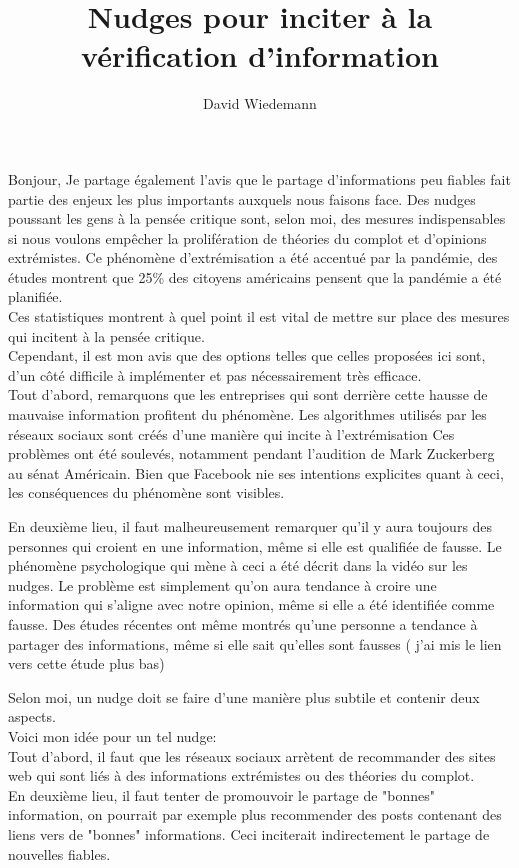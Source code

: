 \documentclass[11pt, a4paper]{article}
\begin{document}
\title{Nudges pour inciter à la vérification d'information}
\author{David Wiedemann}
\maketitle
Bonjour,
Je partage également l'avis que le partage d'informations peu fiables fait partie des enjeux les plus importants auxquels nous faisons face.
Des nudges poussant les gens à la pensée critique sont, selon moi, des mesures indispensables si nous voulons empêcher la prolifération de théories du complot et d'opinions extrémistes.
Ce phénomène d'extrémisation a été accentué par la pandémie, des études montrent   que 25\% des citoyens américains pensent que la pandémie a été planifiée.\\
Ces statistiques montrent à quel point il est vital de mettre sur place des mesures qui incitent à la pensée critique.\\
Cependant, il est mon avis que des options telles que celles proposées ici sont, d'un côté difficile à implémenter et pas nécessairement très efficace.\\
Tout d'abord, remarquons que les entreprises qui sont derrière cette hausse de mauvaise information profitent du phénomène. Les algorithmes utilisés par les réseaux sociaux sont créés d'une manière qui incite à l'extrémisation Ces problèmes ont été soulevés, notamment pendant l'audition de Mark Zuckerberg au sénat Américain.
Bien que Facebook nie ses intentions explicites quant à ceci, les conséquences du phénomène sont visibles.

En deuxième lieu, il faut malheureusement remarquer qu'il y aura toujours des personnes qui croient en une information, même si elle est qualifiée de fausse. Le phénomène psychologique qui mène à ceci a été décrit dans la vidéo sur les nudges. Le problème est simplement qu'on aura tendance à croire une information qui s'aligne avec notre opinion, même si elle a été identifiée comme fausse.
Des études récentes ont même montrés qu'une personne a tendance à partager des informations, même si elle sait qu'elles sont fausses ( j'ai mis le lien vers cette étude plus bas) 

Selon moi, un nudge doit se faire d'une manière plus subtile et contenir deux aspects.\\
Voici mon idée pour un tel nudge:\\
Tout d'abord, il faut que les réseaux sociaux arrètent de recommander des sites web qui sont liés à des informations extrémistes ou des théories du complot.\\
En deuxième lieu, il faut tenter de promouvoir le partage de "bonnes" information, on pourrait par exemple plus recommender des posts contenant des liens vers de "bonnes" informations.
Ceci inciterait indirectement le partage de nouvelles fiables.
\end{document}
